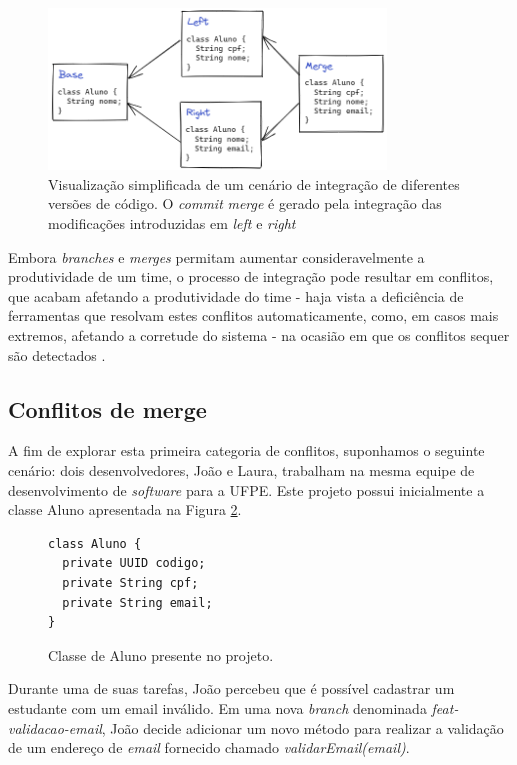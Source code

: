 \documentclass[12pt]{article}
\begin{document}
\begin{figure}[H]
    \centering
    \includegraphics[width=0.80\textwidth]{merge.png}
    \caption{Visualização simplificada de um cenário de integração de diferentes versões de código. O \textit{commit} \textit{merge} é gerado pela integração das modificações introduzidas em \textit{left} e \textit{right}}
    \label{fig:commits}
\end{figure}

Embora \textit{branches} e \textit{merges} permitam aumentar consideravelmente a produtividade de um time, o processo de integração pode resultar em conflitos, que acabam afetando a produtividade do time - haja vista a deficiência de ferramentas que resolvam estes conflitos automaticamente, como, em casos mais extremos, afetando a corretude do sistema - na ocasião em que os conflitos sequer são detectados \cite{cavalcanti:icse}.

\subsection{Conflitos de merge}
A fim de explorar esta primeira categoria de conflitos, suponhamos o seguinte cenário: dois desenvolvedores, João e Laura, trabalham na mesma equipe de desenvolvimento de \textit{software} para a UFPE. Este projeto possui inicialmente a classe Aluno apresentada na Figura \ref{fig:merge1}.

\begin{figure}[H]
\begin{verbatim}
class Aluno {
  private UUID codigo;
  private String cpf;
  private String email;
}
\end{verbatim}
\caption{Classe de Aluno presente no projeto.}
\label{fig:merge1}
\end{figure}

Durante uma de suas tarefas, João percebeu que é possível cadastrar um estudante com um email inválido. Em uma nova \textit{branch} denominada \textit{feat-validacao-email}, João decide adicionar um novo método para realizar a validação de um endereço de \textit{email} fornecido chamado \textit{validarEmail(email)}.
\end{document}
